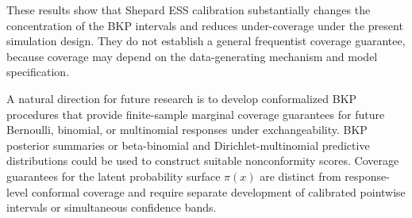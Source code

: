 \documentclass[article, shortnames]{jss}
\begin{document}
These results show that Shepard ESS calibration substantially changes the concentration of the BKP intervals and reduces under-coverage under the present simulation design. They do not establish a general frequentist coverage guarantee, because coverage may depend on the data-generating mechanism and model specification.

A natural direction for future research is to develop conformalized BKP procedures that provide finite-sample marginal coverage guarantees for future Bernoulli, binomial, or multinomial responses under exchangeability. BKP posterior summaries or beta-binomial and Dirichlet-multinomial predictive distributions could be used to construct suitable nonconformity scores. Coverage guarantees for the latent probability surface $\pi(x)$ are distinct from response-level conformal coverage and require separate development of calibrated pointwise intervals or simultaneous confidence bands.
\end{document}
